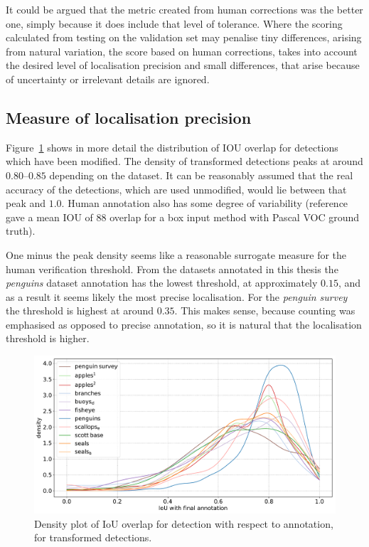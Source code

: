 It could be argued that the metric created from human corrections was the better one, simply because it does include that level of tolerance. Where the scoring calculated from testing on the validation set may penalise tiny differences, arising from natural variation, the score based on human corrections, takes into account the desired level of localisation precision and small differences, that arise because of uncertainty or irrelevant details are ignored.

\subsection {Measure of localisation precision}
\label{sec:localisation_precision}

Figure~\ref{fig:density_iou} shows in more detail the distribution of \gls{IOU} overlap for detections which have been modified. The density of transformed detections peaks at around $0.80$--$0.85$ depending on the dataset. It can be reasonably assumed that the real accuracy of the detections, which are used unmodified, would lie between that peak and $1.0$. Human annotation also has some degree of variability (reference \cite{Papadopoulos2017} gave a mean \gls{IOU} of 88 overlap for a box input method with Pascal VOC ground truth).

One minus the peak density seems like a reasonable surrogate measure for the human verification threshold. From the datasets annotated in this thesis the \emph{penguins} dataset annotation has the lowest threshold, at approximately $0.15$, and as a result it seems likely the most precise localisation. For the \emph{penguin survey} the threshold is highest at around $0.35$. This makes sense, because counting was emphasised as opposed to precise annotation, so it is natural that the localisation threshold is higher. 


\begin{figure}[ht]
\centering
\includegraphics[width=1.0\linewidth]{charts/scatters/iou_dataset.pdf}
\caption{ Density plot of IoU overlap for detection with respect to annotation, for transformed detections. }
\label{fig:density_iou}
\end{figure}



